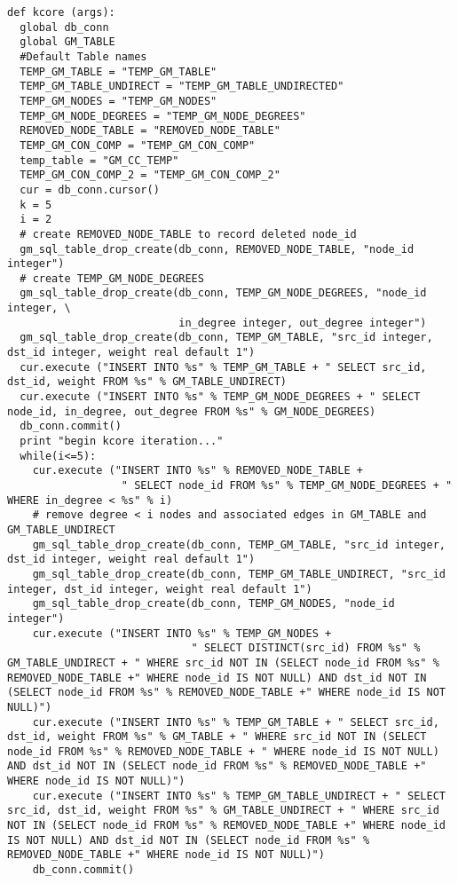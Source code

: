 \begin{lstlisting}
def kcore (args):
  global db_conn
  global GM_TABLE
  #Default Table names
  TEMP_GM_TABLE = "TEMP_GM_TABLE"
  TEMP_GM_TABLE_UNDIRECT = "TEMP_GM_TABLE_UNDIRECTED"
  TEMP_GM_NODES = "TEMP_GM_NODES"
  TEMP_GM_NODE_DEGREES = "TEMP_GM_NODE_DEGREES"
  REMOVED_NODE_TABLE = "REMOVED_NODE_TABLE"
  TEMP_GM_CON_COMP = "TEMP_GM_CON_COMP"
  temp_table = "GM_CC_TEMP"
  TEMP_GM_CON_COMP_2 = "TEMP_GM_CON_COMP_2"
  cur = db_conn.cursor()
  k = 5
  i = 2
  # create REMOVED_NODE_TABLE to record deleted node_id
  gm_sql_table_drop_create(db_conn, REMOVED_NODE_TABLE, "node_id integer")
  # create TEMP_GM_NODE_DEGREES
  gm_sql_table_drop_create(db_conn, TEMP_GM_NODE_DEGREES, "node_id integer, \
                           in_degree integer, out_degree integer")
  gm_sql_table_drop_create(db_conn, TEMP_GM_TABLE, "src_id integer, dst_id integer, weight real default 1")
  cur.execute ("INSERT INTO %s" % TEMP_GM_TABLE + " SELECT src_id, dst_id, weight FROM %s" % GM_TABLE_UNDIRECT)
  cur.execute ("INSERT INTO %s" % TEMP_GM_NODE_DEGREES + " SELECT node_id, in_degree, out_degree FROM %s" % GM_NODE_DEGREES)
  db_conn.commit()
  print "begin kcore iteration..."
  while(i<=5):
    cur.execute ("INSERT INTO %s" % REMOVED_NODE_TABLE +
                  " SELECT node_id FROM %s" % TEMP_GM_NODE_DEGREES + " WHERE in_degree < %s" % i)
    # remove degree < i nodes and associated edges in GM_TABLE and GM_TABLE_UNDIRECT
    gm_sql_table_drop_create(db_conn, TEMP_GM_TABLE, "src_id integer, dst_id integer, weight real default 1")
    gm_sql_table_drop_create(db_conn, TEMP_GM_TABLE_UNDIRECT, "src_id integer, dst_id integer, weight real default 1")
    gm_sql_table_drop_create(db_conn, TEMP_GM_NODES, "node_id integer")
    cur.execute ("INSERT INTO %s" % TEMP_GM_NODES +
                             " SELECT DISTINCT(src_id) FROM %s" % GM_TABLE_UNDIRECT + " WHERE src_id NOT IN (SELECT node_id FROM %s" % REMOVED_NODE_TABLE +" WHERE node_id IS NOT NULL) AND dst_id NOT IN (SELECT node_id FROM %s" % REMOVED_NODE_TABLE +" WHERE node_id IS NOT NULL)")
    cur.execute ("INSERT INTO %s" % TEMP_GM_TABLE + " SELECT src_id, dst_id, weight FROM %s" % GM_TABLE + " WHERE src_id NOT IN (SELECT node_id FROM %s" % REMOVED_NODE_TABLE + " WHERE node_id IS NOT NULL) AND dst_id NOT IN (SELECT node_id FROM %s" % REMOVED_NODE_TABLE +" WHERE node_id IS NOT NULL)")
    cur.execute ("INSERT INTO %s" % TEMP_GM_TABLE_UNDIRECT + " SELECT src_id, dst_id, weight FROM %s" % GM_TABLE_UNDIRECT + " WHERE src_id NOT IN (SELECT node_id FROM %s" % REMOVED_NODE_TABLE +" WHERE node_id IS NOT NULL) AND dst_id NOT IN (SELECT node_id FROM %s" % REMOVED_NODE_TABLE +" WHERE node_id IS NOT NULL)")
    db_conn.commit()


\end{lstlisting}
